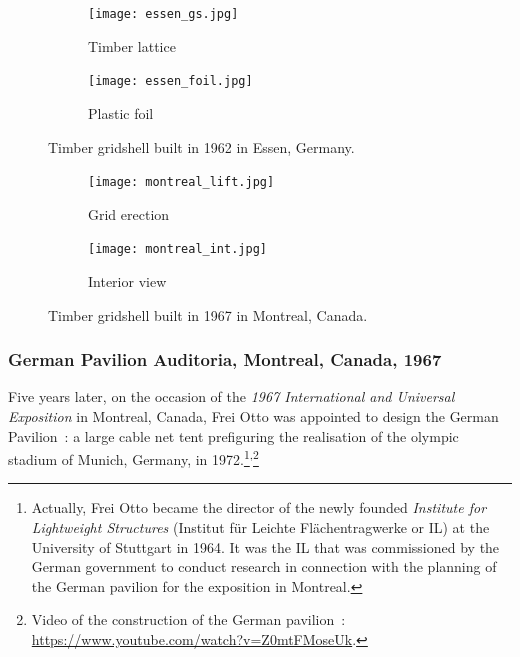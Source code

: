 \begin{figure}[t]
	\begin{subfigure}[b]{\TwoMediaWidth}
		\texttt{[image: essen\_gs.jpg]}
		\caption{Timber lattice}
		\label{fig:essen_a}
	\end{subfigure}%
	\hspace{\MediaGutterWidth}%
	\begin{subfigure}[b]{\TwoMediaWidth}
		\texttt{[image: essen\_foil.jpg]}
		\caption{Plastic foil}
		\label{fig:essen_b}
	\end{subfigure}
	\caption[Timber gridshell built in 1962 in Essen, Germany]{Timber gridshell built in 1962 in Essen, Germany.}
	\label{fig:essen}
\end{figure}

\begin{figure}[t]
	\begin{subfigure}[b]{\TwoMediaWidth}
		\texttt{[image: montreal\_lift.jpg]}
		\caption{Grid erection}
		\label{fig:montreal_a}
	\end{subfigure}%
	\hspace{\MediaGutterWidth}%
	\begin{subfigure}[b]{\TwoMediaWidth}
		\texttt{[image: montreal\_int.jpg]}
		\caption{Interior view}
		\label{fig:montreal_b}
	\end{subfigure}
	\caption[Timber gridshell built in 1967 in Montreal, Canada]{Timber gridshell built in 1967 in Montreal, Canada.}
	\label{fig:montreal}
\end{figure}

\subsubsection{German Pavilion Auditoria, Montreal, Canada, 1967}
Five years later, on the occasion of the \emph{1967 International and Universal Exposition} in Montreal, Canada, Frei Otto was appointed to design the German Pavilion~: a large cable net tent prefiguring the realisation of the olympic stadium of Munich, Germany, in 1972.\footnote{Actually, Frei Otto became the director of the newly founded \emph{Institute for Lightweight Structures} (Institut für Leichte Flächentragwerke or IL) at the University of Stuttgart in 1964. It was the IL that was commissioned by the German government to conduct research in connection with the planning of the German pavilion for the exposition in Montreal.}\textsuperscript{,}\footnote{Video of the construction of the German pavilion~: \url{https://www.youtube.com/watch?v=Z0mtFMoseUk}.}

